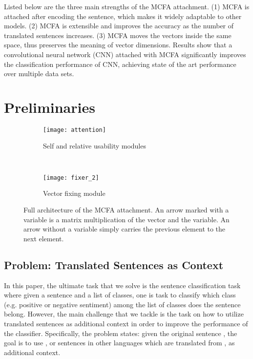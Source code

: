 \documentclass{article}
\begin{document}
Listed below are the three main strengths of the MCFA attachment.
(1) 
MCFA is attached
after encoding the sentence, 
which makes it widely adaptable to other models.
(2) 
MCFA is extensible and improves the accuracy as the number of translated sentences increases.
(3) 
MCFA 
moves the vectors inside the same space, thus preserves the meaning of vector dimensions.
Results show that a convolutional neural network (CNN) attached with MCFA significantly improves the classification performance of CNN, achieving state of the art performance over multiple data sets. 


\section{Preliminaries}



\begin{figure*}[t]
    \centering
    \begin{subfigure}[t]{0.45\textwidth}
        \centering
        \texttt{[image: attention]}
        \caption{Self and relative usability modules}
        \label{fig:sga}
    \end{subfigure}
    ~ 
    \begin{subfigure}[t]{0.45\textwidth}
        \centering
        \texttt{[image: fixer\_2]}
        \caption{Vector fixing module}
        \label{fig:vf}
    \end{subfigure}
    \caption{Full architecture of the MCFA attachment. An arrow marked with a variable is a matrix multiplication of the vector and the variable. An arrow without a variable simply carries the previous element to the next element.}
    \label{fig:arch}
\end{figure*}

\subsection{Problem: Translated Sentences as Context}

In this paper, the ultimate task that we solve is the sentence classification task where given a sentence and a list of classes, one is task to classify which class (e.g. positive or negative sentiment) among the list of classes does the sentence belong. However, the main challenge that we tackle is the task on how to utilize translated sentences as additional context in order to improve the performance of the classifier.
Specifically, the problem states: given the original sentence , the goal is to use , or sentences in other languages which are translated from , as additional context.
\end{document}
